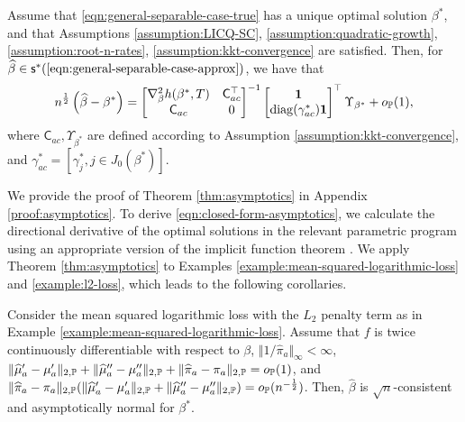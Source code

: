 \begin{theorem} \label{thm:asymptotics}
Assume that \ref{eqn:general-separable-case-true} has a unique optimal solution $\beta^*$, and that Assumptions \ref{assumption:LICQ-SC}, \ref{assumption:quadratic-growth}, \ref{assumption:root-n-rates}, \ref{assumption:kkt-convergence} are satisfied.
Then, for $\widehat{\beta} \in \mathsf{s}^*(\text{\ref{eqn:general-separable-case-approx}})$, we have that
\begin{align} \label{eqn:closed-form-asymptotics}
    n^{\frac{1}{2}} \left(\widehat{\beta} - \beta^* \right) = \begin{bmatrix}
        \nabla^2_{\beta} h(\beta^*,T) & \mathsf{C}_{ac}^\top \\
        \mathsf{C}_{ac} & 0
        \end{bmatrix}^{-1} \begin{bmatrix}
        \bm{1} \\
        \operatorname{diag}(\gamma^*_{ac})\bm{1} 
        \end{bmatrix}^\top
        \Upsilon_{\beta^*} + o_{\mathbb{P}}(1),
\end{align}
where $\mathsf{C}_{ac}, \Upsilon_{\beta^*}$ are defined according to Assumption \ref{assumption:kkt-convergence}, and $\gamma^*_{ac} = [\gamma^*_j, j \in J_0(\beta^*)]$.
\end{theorem} 
We provide the proof of Theorem \ref{thm:asymptotics} in Appendix \ref{proof:asymptotics}.
To derive \eqref{eqn:closed-form-asymptotics}, we calculate the directional derivative of the optimal solutions in the relevant parametric program using an appropriate version of the implicit function theorem \citep{dontchev2009implicit}. We apply Theorem \ref{thm:asymptotics} to Examples \ref{example:mean-squared-logarithmic-loss} and \ref{example:l2-loss}, which leads to the following corollaries.

\begin{corollary} \label{cor:1}
    Consider the mean squared logarithmic loss with the $L_2$ penalty term as in Example \ref{example:mean-squared-logarithmic-loss}. Assume that $f$ is twice continuously differentiable with respect to $\beta$, $\Vert 1/\widehat{\pi}_a \Vert_\infty < \infty$,  $\Vert \widehat{\mu}'_{a}- \mu'_{a} \Vert_{2,\mathbb{P}} +\Vert \widehat{\mu}''_{a}- \mu''_{a} \Vert_{2,\mathbb{P}} + \Vert \widehat{\pi}_{a}- \pi_{a} \Vert_{2,\mathbb{P}} = o_{\mathbb{P}}(1)$, and $\Vert \widehat{\pi}_{a} - {\pi}_{a} \Vert_{2,\mathbb{P}} ( \Vert \widehat{\mu}'_{a} - \mu'_{a} \Vert_{2,\mathbb{P}} + \Vert \widehat{\mu}''_{a}- \mu''_{a} \Vert_{2,\mathbb{P}}) = o_{\mathbb{P}}(n^{-\frac{1}{2}})$. Then, $\widehat{\beta}$ is $\sqrt{n}$-consistent and asymptotically normal for $\beta^*$.     
\end{corollary}


